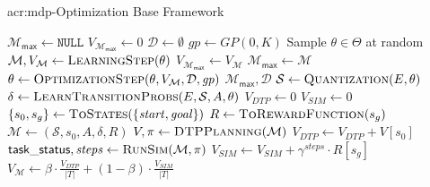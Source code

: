 \begin{algorithm}[t!]
	\caption{\acrshort{acr:mdp}-Optimization Base Framework}
	\label{alg:base-framework}
	\begin{algorithmic}[1]
		\State $\mathcal{M}_\mathsf{max} \gets \texttt{NULL}$
		\State $V_{\mathcal{M}_\mathsf{max}} \gets 0$
		\State $\mathcal{D} \gets \emptyset$ 
		\State $\mathit{gp} \gets GP(0, K)$ 
		\State Sample $\theta \in \Theta$ at random
		\Repeat
		\State $\mathcal{M}, V_\mathcal{M} \gets \textproc{LearningStep}(\theta)$
		\State $V_{\mathcal{M}_\mathsf{max}} \gets V_\mathcal{M}$
		\State $\mathcal{M}_\mathsf{max} \gets \mathcal{M}$
		\EndIf
		\State $\theta \gets \textproc{OptimizationStep}(\theta, V_\mathcal{M}, \mathcal{D}, \mathit{gp})$
		\State\Return $\mathcal{M}_\mathsf{max}, \mathcal{D}$
		\Statex
			\label{alg:line:learn}
			\State $\mathcal{S} \gets \textproc{Quantization}(E, \theta)$
			\State $\delta \gets \textproc{LearnTransitionProbs}(E, \mathcal{S}, A, \theta)$ 
			\State $V_\mathit{DTP} \gets 0$
			\State $V_\mathit{SIM} \gets 0$
			\State $\{s_0, s_g\} \gets \textproc{ToStates}(\{\mathit{start}, \mathit{goal}\})$
			\State $R \gets \textproc{ToRewardFunction}(s_g)$
			\State $\mathcal{M} \gets (\mathcal{S}, s_0, A, \delta, R)$
			\State $V, \pi \gets \textproc{DTPPlanning}(\mathcal{M})$	
			\State $V_\mathit{DTP} \gets V_\mathit{DTP} + V[s_0]$
				\State $\mathsf{task\_status}, \mathit{steps} \gets \textproc{RunSim}(\mathcal{M}, \pi)$
					\State $V_\mathit{SIM} \gets V_\mathit{SIM} + \gamma^\mathit{steps} \cdot R[s_g]$
				\EndIf
			\EndIf
			\EndFor
			\State $V_\mathcal{M} \gets \beta \cdot \frac{V_\mathit{DTP}}{|T|} + (1 - \beta) \cdot \frac{V_\mathit{SIM}}{|T|}$
			

\end{algorithmic}
\end{algorithm}
